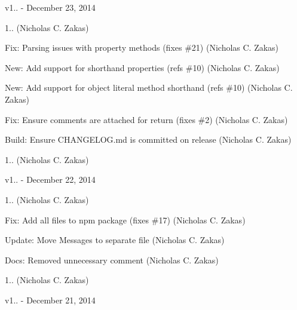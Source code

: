 v1.. -\/ December 23, 2014


\begin{DoxyItemize}
\item 1.. (Nicholas C. Zakas)
\item Fix\+: Parsing issues with property methods (fixes \#21) (Nicholas C. Zakas)
\item New\+: Add support for shorthand properties (refs \#10) (Nicholas C. Zakas)
\item New\+: Add support for object literal method shorthand (refs \#10) (Nicholas C. Zakas)
\item Fix\+: Ensure comments are attached for return (fixes \#2) (Nicholas C. Zakas)
\item Build\+: Ensure C\+H\+A\+N\+G\+E\+L\+O\+G.\+md is committed on release (Nicholas C. Zakas)
\item 1.. (Nicholas C. Zakas)
\end{DoxyItemize}

v1.. -\/ December 22, 2014


\begin{DoxyItemize}
\item 1.. (Nicholas C. Zakas)
\item Fix\+: Add all files to npm package (fixes \#17) (Nicholas C. Zakas)
\item Update\+: Move Messages to separate file (Nicholas C. Zakas)
\item Docs\+: Removed unnecessary comment (Nicholas C. Zakas)
\item 1.. (Nicholas C. Zakas)
\end{DoxyItemize}

v1.. -\/ December 21, 2014


